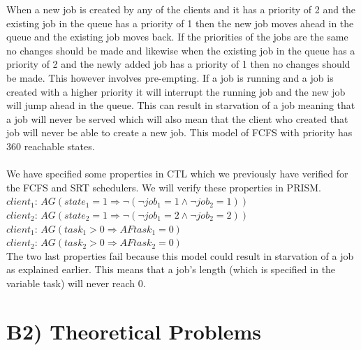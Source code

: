 \documentclass[12pt]{report}
\begin{document}
When a new job is created by any of the clients and it has a priority of 2 and the existing job in the queue has a priority of 1 then the new job moves ahead in the queue and the existing job moves back. If the priorities of the jobs are the same no changes should be made and likewise when the existing job in the queue has a priority of 2 and the newly added job has a priority of 1 then no changes should be made. This however involves pre-empting. If a job is running and a job is created with a higher priority it will interrupt the running job and the new job will jump ahead in the queue. This can result in starvation of a job meaning that a job will never be served which will also mean that the client who created that job will never be able to create a new job. This model of FCFS with priority has 360 reachable states.\\
\\
We have specified some properties in CTL which we previously have verified for the FCFS and SRT schedulers. We will verify these properties in PRISM.\\
$client_1$: $AG (state_1 = 1 \Rightarrow \neg(\neg job_1 = 1 \wedge \neg job_2 = 1))$\\
$client_2$: $AG (state_2 = 1 \Rightarrow \neg(\neg job_1 = 2 \wedge \neg job_2 = 2))$\\
$client_1$: $AG(task_1>0 \Rightarrow AF task_1 = 0)$ \\
$client_2$: $AG(task_2>0 \Rightarrow AF task_2 = 0)$ \\

The two last properties fail because this model could result in starvation of a job as explained earlier. This means that a job's length (which is specified in the variable task) will never reach 0.

\section*{B2) Theoretical Problems}
\end{document}

